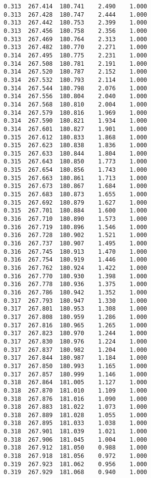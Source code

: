 \begin{verbatim}
   0.313  267.414  180.741    2.490    1.000
   0.313  267.428  180.747    2.444    1.000
   0.313  267.442  180.753    2.399    1.000
   0.313  267.456  180.758    2.356    1.000
   0.313  267.469  180.764    2.313    1.000
   0.313  267.482  180.770    2.271    1.000
   0.314  267.495  180.775    2.231    1.000
   0.314  267.508  180.781    2.191    1.000
   0.314  267.520  180.787    2.152    1.000
   0.314  267.532  180.793    2.114    1.000
   0.314  267.544  180.798    2.076    1.000
   0.314  267.556  180.804    2.040    1.000
   0.314  267.568  180.810    2.004    1.000
   0.314  267.579  180.816    1.969    1.000
   0.314  267.590  180.821    1.934    1.000
   0.314  267.601  180.827    1.901    1.000
   0.315  267.612  180.833    1.868    1.000
   0.315  267.623  180.838    1.836    1.000
   0.315  267.633  180.844    1.804    1.000
   0.315  267.643  180.850    1.773    1.000
   0.315  267.654  180.856    1.743    1.000
   0.315  267.663  180.861    1.713    1.000
   0.315  267.673  180.867    1.684    1.000
   0.315  267.683  180.873    1.655    1.000
   0.315  267.692  180.879    1.627    1.000
   0.315  267.701  180.884    1.600    1.000
   0.316  267.710  180.890    1.573    1.000
   0.316  267.719  180.896    1.546    1.000
   0.316  267.728  180.902    1.521    1.000
   0.316  267.737  180.907    1.495    1.000
   0.316  267.745  180.913    1.470    1.000
   0.316  267.754  180.919    1.446    1.000
   0.316  267.762  180.924    1.422    1.000
   0.316  267.770  180.930    1.398    1.000
   0.316  267.778  180.936    1.375    1.000
   0.316  267.786  180.942    1.352    1.000
   0.317  267.793  180.947    1.330    1.000
   0.317  267.801  180.953    1.308    1.000
   0.317  267.808  180.959    1.286    1.000
   0.317  267.816  180.965    1.265    1.000
   0.317  267.823  180.970    1.244    1.000
   0.317  267.830  180.976    1.224    1.000
   0.317  267.837  180.982    1.204    1.000
   0.317  267.844  180.987    1.184    1.000
   0.317  267.850  180.993    1.165    1.000
   0.317  267.857  180.999    1.146    1.000
   0.318  267.864  181.005    1.127    1.000
   0.318  267.870  181.010    1.109    1.000
   0.318  267.876  181.016    1.090    1.000
   0.318  267.883  181.022    1.073    1.000
   0.318  267.889  181.028    1.055    1.000
   0.318  267.895  181.033    1.038    1.000
   0.318  267.901  181.039    1.021    1.000
   0.318  267.906  181.045    1.004    1.000
   0.318  267.912  181.050    0.988    1.000
   0.318  267.918  181.056    0.972    1.000
   0.319  267.923  181.062    0.956    1.000
   0.319  267.929  181.068    0.940    1.000

\end{verbatim}
